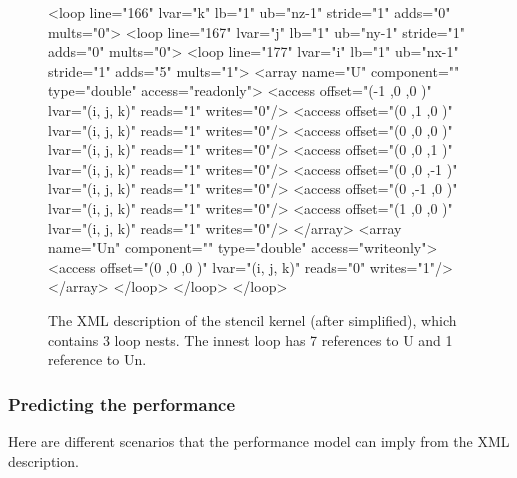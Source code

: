 \documentclass{article}
\begin{document}
\begin{figure}[htp]
\begin{boxedverbatim}
<loop line="166" lvar="k" lb="1" ub="nz-1" stride="1" adds="0" mults="0">
<loop line="167" lvar="j" lb="1" ub="ny-1" stride="1" adds="0" mults="0">
<loop line="177" lvar="i" lb="1" ub="nx-1" stride="1" adds="5" mults="1">
<array name="U" component="" type="double" access="readonly">
<access offset="(-1 ,0 ,0 )" lvar="(i, j, k)" reads="1" writes="0"/>
<access offset="(0 ,1 ,0 )" lvar="(i, j, k)" reads="1" writes="0"/>
<access offset="(0 ,0 ,0 )" lvar="(i, j, k)" reads="1" writes="0"/>
<access offset="(0 ,0 ,1 )" lvar="(i, j, k)" reads="1" writes="0"/>
<access offset="(0 ,0 ,-1 )" lvar="(i, j, k)" reads="1" writes="0"/>
<access offset="(0 ,-1 ,0 )" lvar="(i, j, k)" reads="1" writes="0"/>
<access offset="(1 ,0 ,0 )" lvar="(i, j, k)" reads="1" writes="0"/>
</array>
<array name="Un" component="" type="double" access="writeonly">
<access offset="(0 ,0 ,0 )" lvar="(i, j, k)" reads="0" writes="1"/>
</array>
</loop>
</loop>
</loop>
\end{boxedverbatim}
\caption{The XML description of the stencil kernel (after simplified), which contains 3 loop nests. The innest loop has 7 references to U and 1 reference to Un.}
\label{7pointstencilOutput}
\end{figure}

\subsubsection{Predicting the performance}
Here are different scenarios that the performance model can imply from the XML description.
\end{document}
